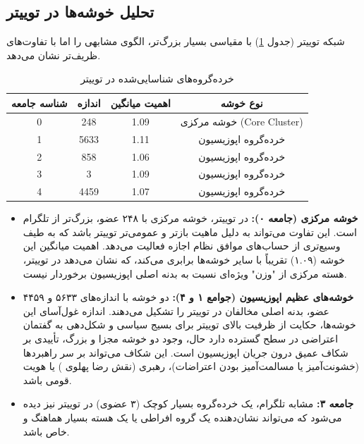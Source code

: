 \documentclass{article}
\begin{document}
	\subsection{تحلیل خوشه‌ها در توییتر}
	شبکه توییتر (جدول \ref{tab:communities_twitter}) با مقیاسی بسیار بزرگ‌تر، الگوی مشابهی را اما با تفاوت‌های ظریف‌تر نشان می‌دهد.
	
	\begin{table}[h!]
		\centering
		\caption{خرده‌گروه‌های شناسایی‌شده در توییتر}
		\label{tab:communities_twitter}
		\begin{tabular}{@{}cccc@{}}
			\toprule
			\textbf{شناسه جامعه} & \textbf{اندازه} & \textbf{اهمیت میانگین} & \textbf{نوع خوشه} \\ \midrule
			0                    & 248              & 1.09                   & خوشه مرکزی (Core Cluster) \\
			1                    & 5633             & 1.11                   & خرده‌گروه اپوزیسیون \\
			2                    & 858              & 1.06                   & خرده‌گروه اپوزیسیون \\
			3                    & 3                & 1.09                   & خرده‌گروه اپوزیسیون \\
			4                    & 4459             & 1.07                   & خرده‌گروه اپوزیسیون \\ \bottomrule
		\end{tabular}
	\end{table}
	
	\begin{itemize}
		\item \textbf{خوشه مرکزی (جامعه ۰):} در توییتر، خوشه مرکزی با ۲۴۸ عضو، بزرگ‌تر از تلگرام است. این تفاوت می‌تواند به دلیل ماهیت بازتر و عمومی‌تر توییتر باشد که به طیف وسیع‌تری از حساب‌های موافق نظام اجازه فعالیت می‌دهد. اهمیت میانگین این خوشه (۱.۰۹) تقریباً با سایر خوشه‌ها برابری می‌کند، که نشان می‌دهد در توییتر، هسته مرکزی از "وزن" ویژه‌ای نسبت به بدنه اصلی اپوزیسیون برخوردار نیست.
		\item \textbf{خوشه‌های عظیم اپوزیسیون (جوامع ۱ و ۴):} دو خوشه با اندازه‌های ۵۶۳۳ و ۴۴۵۹ عضو، بدنه اصلی مخالفان در توییتر را تشکیل می‌دهند. اندازه غول‌آسای این خوشه‌ها، حکایت از ظرفیت بالای توییتر برای بسیج سیاسی و شکل‌دهی به گفتمان اعتراضی در سطح گسترده دارد  حال، وجود دو خوشه مجزا و بزرگ، تأییدی بر شکاف عمیق درون جریان اپوزیسیون است. این شکاف می‌تواند بر سر راهبردها (خشونت‌آمیز یا مسالمت‌آمیز بودن اعتراضات)، رهبری (نقش رضا پهلوی ) یا هویت قومی باشد.
		\item \textbf{جامعه ۳:} مشابه تلگرام، یک خرده‌گروه بسیار کوچک (۳ عضوی) در توییتر نیز دیده می‌شود که می‌تواند نشان‌دهنده یک گروه افراطی یا یک هسته بسیار هماهنگ و خاص باشد.
	\end{itemize}
	
\end{document}
